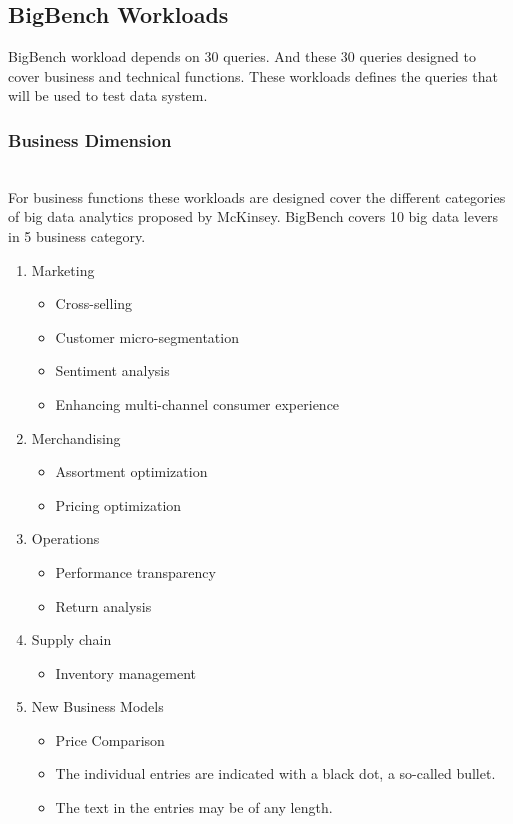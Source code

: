 \documentclass[sigconf,10pt]{acmart}
\begin{document}
\subsection{BigBench Workloads}
BigBench workload depends on 30 queries. And these 30 queries designed to cover business and technical functions. These workloads defines the queries that will be used to test data system.

\subsubsection{Business Dimension} \hfill\\
For business functions these workloads are designed cover the different categories of big data analytics proposed by McKinsey\cite{mckinsey}. BigBench covers 10 big data levers in 5 business category.
\begin{enumerate}
   \item Marketing
        \begin{itemize}
            \item Cross-selling
            \item Customer micro-segmentation
            \item Sentiment analysis
            \item Enhancing multi-channel consumer experience
        \end{itemize}
   \item Merchandising
        \begin{itemize}
            \item Assortment optimization
            \item Pricing optimization
        \end{itemize}
   \item Operations
           \begin{itemize}
            \item Performance transparency
            \item Return analysis
        \end{itemize}
   \item Supply chain
           \begin{itemize}
            \item Inventory management
        \end{itemize}
   \item New Business Models
           \begin{itemize}
            \item Price Comparison
        \end{itemize}
   \begin{itemize}
     \item The individual entries are indicated with a black dot, a so-called bullet.
     \item The text in the entries may be of any length.
   \end{itemize}
\end{enumerate}
\end{document}
